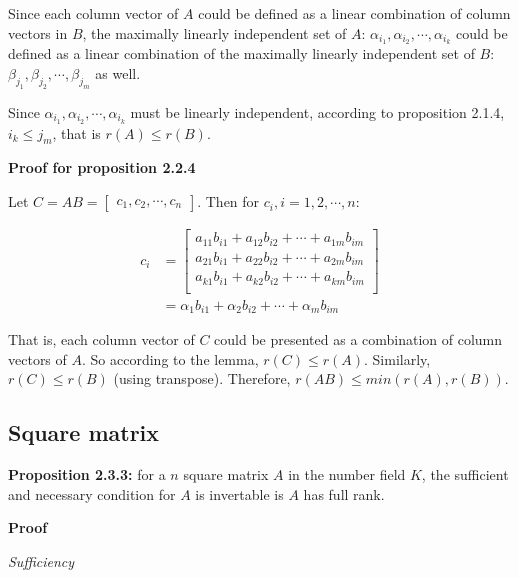 \documentclass{article}
\begin{document}
Since each column vector of \(A\) could be defined as a linear combination
of column vectors in \(B\), the maximally linearly independent set
of \(A\): \(\alpha_{i_1}, \alpha_{i_2}, \cdots, \alpha_{i_k}\)
could be defined as a linear combination of
the maximally linearly independent set of \(B\):
\(\beta_{j_1}, \beta_{j_2}, \cdots, \beta_{j_m}\) as well.

Since \(\alpha_{i_1}, \alpha_{i_2}, \cdots, \alpha_{i_k}\) must be
linearly independent, according to proposition 2.1.4,
\(i_k \leq j_m \), that is \(r(A)\leq r(B)\).

\vspace{2mm}
\textbf{Proof for proposition 2.2.4}

Let \(C=AB=\begin{bmatrix}c_1,c_2,\cdots,c_n\end{bmatrix}\). Then
for \(c_i, i = 1, 2, \cdots, n\):

\begin{equation}
\begin{split}
c_i &= \begin{bmatrix}
a_{11}b_{i1}+a_{12}b_{i2}+\cdots+a_{1m}b_{im}\\
a_{21}b_{i1}+a_{22}b_{i2}+\cdots+a_{2m}b_{im}\\
a_{k1}b_{i1}+a_{k2}b_{i2}+\cdots+a_{km}b_{im}\\
\end{bmatrix}\\
&=\alpha_1b_{i1}+\alpha_2b_{i2}+\cdots+\alpha_mb_{im}
\end{split}
\end{equation}

That is, each column vector of \(C\) could be presented as
a combination of column vectors of \(A\). So according
to the lemma, \(r(C)\leq r(A)\). Similarly, \(r(C)\leq r(B)\)
(using transpose). Therefore, \(r(AB)\leq min(r(A), r(B))\).

\subsection{Square matrix}

\textbf{Proposition 2.3.3:} for a \(n\) square matrix \(A\) in the number
field \(K\), the sufficient and necessary condition for \(A\) is
invertable is \(A\) has full rank.

\vspace{2mm}
\textbf{Proof}

\vspace{2mm}
\textit{Sufficiency}
\end{document}
